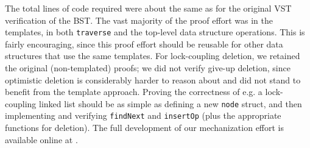 \documentclass[a4paper,UKenglish,cleveref, autoref, thm-restate]{lipics-v2021}
\begin{document}
The total lines of code required were about the same as for the original VST verification of the BST. The vast majority of the proof effort was in the templates, in both \lstinline{traverse} and the top-level data structure operations. This is fairly encouraging, since this proof effort should be reusable for other data structures that use the same templates. For lock-coupling deletion, we retained the original (non-templated) proofs; we did not verify give-up deletion, since optimistic deletion is considerably harder to reason about and did not stand to benefit from the template approach.
Proving the correctness of e.g. a lock-coupling linked list should be as simple as defining a new \lstinline{node} struct, and then implementing and verifying \lstinline{findNext} and \lstinline{insertOp} (plus the appropriate functions for deletion).
The full development of our mechanization effort is available online at
\href{https://github.com/PrincetonUniversity/DeepSpecDB/tree/master/concurrency/templates}{\color{blue}{https://github.com/PrincetonUniversity/DeepSpecDB/tree/master/concurrency/templates}}.
\end{document}
